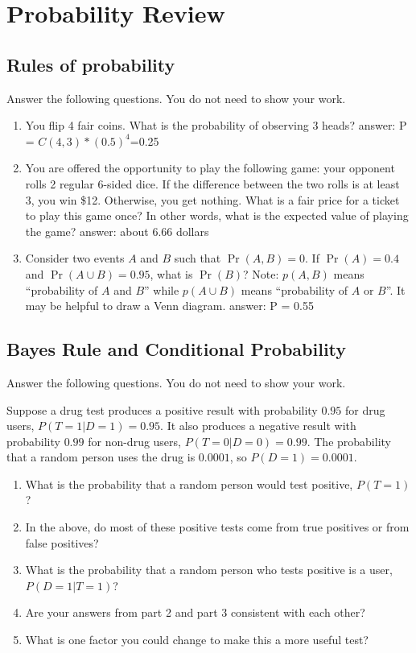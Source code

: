 \documentclass{article}
\def\blu#1{{\color{blu}#1}}
\begin{document}
\section{Probability Review}



\subsection{Rules of probability}

\blu{Answer the following questions.} You do not need to show your work.

\begin{enumerate}
\item You flip 4 fair coins. What is the probability of observing 3 heads?
\newline
answer: P = $C(4,3)*(0.5)^4$=0.25
\item You are offered the opportunity to play the following game: your opponent rolls 2 regular 6-sided dice. If the difference between the two rolls is at least 3, you win \$12. Otherwise, you get nothing. What is a fair price for a ticket to play this game once? In other words, what is the expected value of playing the game?
\newline
answer: about 6.66 dollars
\item Consider two events $A$ and $B$ such that $\Pr(A, B)=0$. If $\Pr(A) = 0.4$ and $\Pr(A \cup B) = 0.95$, what is $\Pr(B)$? Note: $p(A, B)$ means
``probability of $A$ and $B$'' while $p(A \cup B)$ means ``probability of $A$ or $B$''. It may be helpful to draw a Venn diagram.
\newline
answer: P = 0.55
\end{enumerate}

\subsection{Bayes Rule and Conditional Probability}

\blu{Answer the following questions.} You do not need to show your work.

Suppose a drug test produces a positive result with probability $0.95$ for drug users, $P(T=1|D=1)=0.95$. It also produces a negative result with probability $0.99$ for non-drug users, $P(T=0|D=0)=0.99$. The probability that a random person uses the drug is $0.0001$, so $P(D=1)=0.0001$. 

\begin{enumerate}
\item What is the probability that a random person would test positive, $P(T=1)$?
\item In the above, do most of these positive tests come from true positives or from false positives? 
\item What is the probability that a random person who tests positive is a user, $P(D=1|T=1)$?
\item Are your answers from part 2 and part 3 consistent with each other?
\item What is one factor you could change to make this a more useful test?
\end{enumerate}
\end{document}
